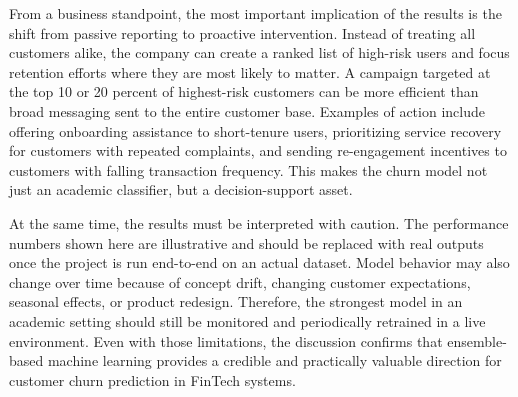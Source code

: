 From a business standpoint, the most important implication of the results is the shift from passive reporting to proactive intervention. Instead of treating all customers alike, the company can create a ranked list of high-risk users and focus retention efforts where they are most likely to matter. A campaign targeted at the top 10 or 20 percent of highest-risk customers can be more efficient than broad messaging sent to the entire customer base. Examples of action include offering onboarding assistance to short-tenure users, prioritizing service recovery for customers with repeated complaints, and sending re-engagement incentives to customers with falling transaction frequency. This makes the churn model not just an academic classifier, but a decision-support asset.

At the same time, the results must be interpreted with caution. The performance numbers shown here are illustrative and should be replaced with real outputs once the project is run end-to-end on an actual dataset. Model behavior may also change over time because of concept drift, changing customer expectations, seasonal effects, or product redesign. Therefore, the strongest model in an academic setting should still be monitored and periodically retrained in a live environment. Even with those limitations, the discussion confirms that ensemble-based machine learning provides a credible and practically valuable direction for customer churn prediction in FinTech systems.
